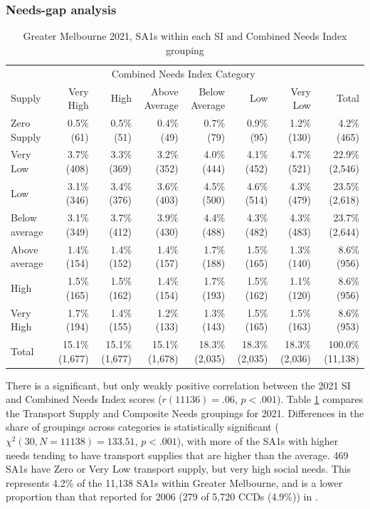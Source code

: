 \documentclass[preprint, 3p,
authoryear]{elsarticle} %
\begin{document}
\subsubsection{Needs-gap analysis}\label{needs-gap-analysis}

\begin{table}

\caption{\label{tab:Greater_Melbourne_2021_needs_gap_zones}Greater Melbourne 2021, SA1s within each SI and Combined Needs Index grouping}
\centering
\fontsize{7}{9}\selectfont
\begin{tabular}[t]{l|r|r|r|r|r|r|r}
\hline
\multicolumn{1}{c|}{ } & \multicolumn{6}{c|}{Combined Needs Index Category} & \multicolumn{1}{c}{ } \\
\cline{2-7}
Supply & Very High & High & Above Average & Below Average & Low & Very Low & Total\\
\hline
Zero Supply & 0.5\%    (61) & 0.5\%    (51) & 0.4\%    (49) & 0.7\%    (79) & 0.9\%    (95) & 1.2\%   (130) & 4.2\%    (465)\\
\hline
Very Low & 3.7\%   (408) & 3.3\%   (369) & 3.2\%   (352) & 4.0\%   (444) & 4.1\%   (452) & 4.7\%   (521) & 22.9\%  (2,546)\\
\hline
Low & 3.1\%   (346) & 3.4\%   (376) & 3.6\%   (403) & 4.5\%   (500) & 4.6\%   (514) & 4.3\%   (479) & 23.5\%  (2,618)\\
\hline
Below average & 3.1\%   (349) & 3.7\%   (412) & 3.9\%   (430) & 4.4\%   (488) & 4.3\%   (482) & 4.3\%   (483) & 23.7\%  (2,644)\\
\hline
Above average & 1.4\%   (154) & 1.4\%   (152) & 1.4\%   (157) & 1.7\%   (188) & 1.5\%   (165) & 1.3\%   (140) & 8.6\%    (956)\\
\hline
High & 1.5\%   (165) & 1.5\%   (162) & 1.4\%   (154) & 1.7\%   (193) & 1.5\%   (162) & 1.1\%   (120) & 8.6\%    (956)\\
\hline
Very High & 1.7\%   (194) & 1.4\%   (155) & 1.2\%   (133) & 1.3\%   (143) & 1.5\%   (165) & 1.5\%   (163) & 8.6\%    (953)\\
\hline
Total & 15.1\% (1,677) & 15.1\% (1,677) & 15.1\% (1,678) & 18.3\% (2,035) & 18.3\% (2,035) & 18.3\% (2,036) & 100.0\% (11,138)\\
\hline
\end{tabular}
\end{table}

There is a significant, but only weakly positive correlation between the
2021 SI and Combined Needs Index scores (\(r(11136) = .06\),
\(p < .001\)). Table \ref{tab:Greater_Melbourne_2021_needs_gap_zones}
compares the Transport Supply and Composite Needs groupings for 2021.
Differences in the share of groupings across categories is statistically
significant (\(\chi^2(30, N = 11138) = 133.51\), \(p < .001\)), with
more of the SA1s with higher needs tending to have transport supplies
that are higher than the average. 469 SA1s have Zero or Very Low
transport supply, but very high social needs. This represents 4.2\% of
the 11,138 SA1s within Greater Melbourne, and is a lower proportion than
that reported for 2006 (279 of 5,720 CCDs (4.9\%)) in
\citet{currie2010identifying}.
\end{document}
